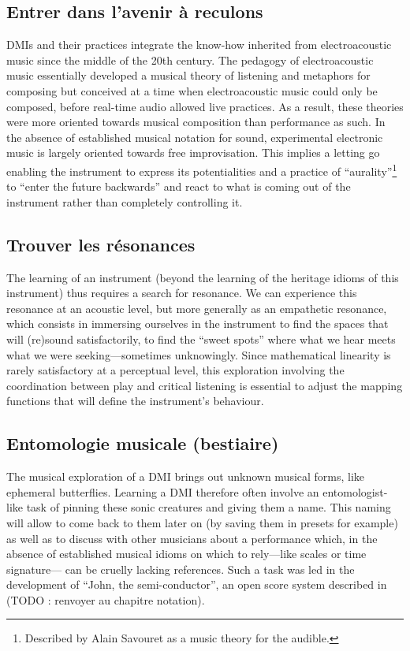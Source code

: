 \subsection{Entrer dans l'avenir à reculons}
DMIs and their practices integrate the know-how inherited from electroacoustic music since the middle of the 20th century. The pedagogy of electroacoustic music essentially developed a musical theory of listening \cite{schaeffer_traite_1966} and metaphors for composing \cite{bayle_musique_1993} but conceived at a time when electroacoustic music could only be composed, before real-time audio allowed live practices. As a result, these theories were more oriented towards musical composition than performance as such.
	In the absence of established musical notation for sound, experimental electronic music is largely oriented towards free improvisation. This implies a letting go enabling the instrument to express its potentialities and a practice of “aurality”\footnote{Described by Alain Savouret as a music theory for the audible.} to “enter the future backwards” \cite{savouret_introduction_2010} and react to what is coming out of the instrument rather than completely controlling it.
	
	
\subsection{Trouver les résonances}
	The learning of an instrument (beyond the learning of the heritage idioms of this instrument) thus requires a search for resonance. We can experience this resonance at an acoustic level, but more generally as an empathetic resonance, which consists in immersing ourselves in the instrument to find the spaces that will (re)sound satisfactorily, to find the “sweet spots” where what we hear meets what we were seeking—sometimes unknowingly. Since mathematical linearity is rarely satisfactory at a perceptual level, this exploration involving the coordination between play and critical listening is essential to adjust the mapping functions that will define the instrument's behaviour.
	
\subsection{Entomologie musicale (bestiaire)}
The musical exploration of a DMI brings out unknown musical forms, like ephemeral butterflies. Learning a DMI therefore often involve an entomologist-like task of pinning these sonic creatures and giving them a name. This naming will allow to come back to them later on (by saving them in presets for example) as well as to discuss with other musicians about a performance which, in the absence of established musical idioms on which to rely—like scales or time signature— can be cruelly lacking references. Such a task was led in the development of “John, the semi-conductor”, an open score system described in \cite{goudard_john_2018} (TODO : renvoyer au chapitre notation).

